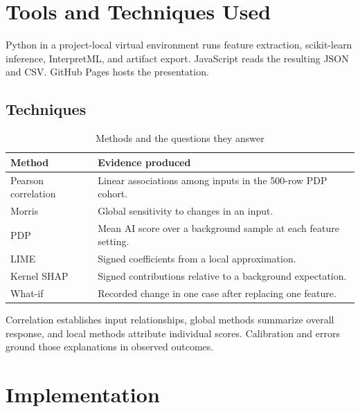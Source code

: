 \documentclass[12pt,oneside]{report}
\begin{document}
\chapter{Tools and Techniques Used}
Python in a project-local virtual environment runs feature extraction, scikit-learn inference, InterpretML, and artifact export. JavaScript reads the resulting JSON and CSV. GitHub Pages hosts the presentation.
\section{Techniques}
\begin{table}[htbp]\centering
\caption{Methods and the questions they answer}
\begin{tabularx}{\linewidth}{lX}
\toprule Method & Evidence produced \\ \midrule
Pearson correlation & Linear associations among inputs in the 500-row PDP cohort. \\
Morris & Global sensitivity to changes in an input. \\
PDP & Mean AI score over a background sample at each feature setting. \\
LIME & Signed coefficients from a local approximation. \\
Kernel SHAP & Signed contributions relative to a background expectation. \\
What-if & Recorded change in one case after replacing one feature. \\
\bottomrule
\end{tabularx}
\end{table}
Correlation establishes input relationships, global methods summarize overall response, and local methods attribute individual scores. Calibration and errors ground those explanations in observed outcomes.
\chapter{Implementation}
\end{document}
